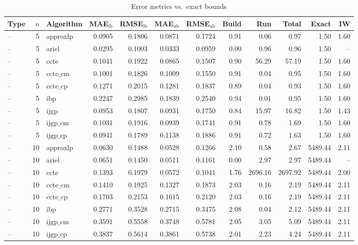 \begin{table}[ht]
\centering
\scriptsize
\caption{Error metrics vs.\ exact bounds}
\begin{tabular}{lrlrrrrrrrrr}
\toprule
Type & $n$ & Algorithm & MAE$_{\text{lb}}$ & RMSE$_{\text{lb}}$ & MAE$_{\text{ub}}$ & RMSE$_{\text{ub}}$ & Build & Run & Total & Exact & IW \\
\midrule
-- & 5 & approxlp & 0.0905 & 0.1806 & 0.0871 & 0.1724 & 0.91 & 0.06 & 0.97 & 1.50 & 1.60 \\
-- & 5 & ariel & 0.0295 & 0.1003 & 0.0333 & 0.0959 & 0.00 & 0.96 & 0.96 & 1.50 & -- \\
-- & 5 & ccte & 0.1041 & 0.1922 & 0.0865 & 0.1507 & 0.90 & 56.29 & 57.19 & 1.50 & 1.60 \\
-- & 5 & $\text{ccte\_cm}$ & 0.1001 & 0.1826 & 0.1009 & 0.1550 & 0.91 & 0.04 & 0.95 & 1.50 & 1.60 \\
-- & 5 & $\text{ccte\_cp}$ & 0.1271 & 0.2015 & 0.1281 & 0.1837 & 0.89 & 0.04 & 0.93 & 1.50 & 1.60 \\
-- & 5 & ibp & 0.2247 & 0.2985 & 0.1839 & 0.2540 & 0.94 & 0.01 & 0.95 & 1.50 & 1.60 \\
-- & 5 & ijgp & 0.0953 & 0.1807 & 0.0931 & 0.1750 & 0.84 & 15.97 & 16.82 & 1.50 & 1.43 \\
-- & 5 & $\text{ijgp\_cm}$ & 0.1031 & 0.1916 & 0.0939 & 0.1741 & 0.91 & 0.78 & 1.69 & 1.50 & 1.60 \\
-- & 5 & $\text{ijgp\_cp}$ & 0.0941 & 0.1789 & 0.1138 & 0.1886 & 0.91 & 0.72 & 1.63 & 1.50 & 1.60 \\
-- & 10 & approxlp & 0.0630 & 0.1488 & 0.0528 & 0.1266 & 2.10 & 0.58 & 2.67 & 5489.44 & 2.11 \\
-- & 10 & ariel & 0.0651 & 0.1450 & 0.0511 & 0.1161 & 0.00 & 2.97 & 2.97 & 5489.44 & -- \\
-- & 10 & ccte & 0.1393 & 0.1979 & 0.0572 & 0.1041 & 1.76 & 2696.16 & 2697.92 & 5489.44 & 2.00 \\
-- & 10 & $\text{ccte\_cm}$ & 0.1410 & 0.1925 & 0.1327 & 0.1873 & 2.03 & 0.16 & 2.19 & 5489.44 & 2.11 \\
-- & 10 & $\text{ccte\_cp}$ & 0.1703 & 0.2153 & 0.1615 & 0.2120 & 2.03 & 0.16 & 2.19 & 5489.44 & 2.11 \\
-- & 10 & ibp & 0.2771 & 0.3528 & 0.2715 & 0.3475 & 2.08 & 0.04 & 2.12 & 5489.44 & 2.11 \\
-- & 10 & $\text{ijgp\_cm}$ & 0.3591 & 0.5558 & 0.3748 & 0.5781 & 2.05 & 3.05 & 5.09 & 5489.44 & 2.11 \\
-- & 10 & $\text{ijgp\_cp}$ & 0.3837 & 0.5614 & 0.3861 & 0.5738 & 2.01 & 2.23 & 4.24 & 5489.44 & 2.11 \\
\bottomrule
\end{tabular}
\end{table}
